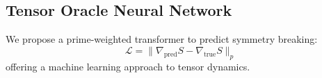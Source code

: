 \documentclass[12pt]{article}
\begin{document}
\subsection{Tensor Oracle Neural Network}
We propose a prime-weighted transformer to predict symmetry breaking:
\begin{equation}
\mathcal{L} = \| \nabla_{\text{pred}} S - \nabla_{\text{true}} S \|_p
\end{equation}
offering a machine learning approach to tensor dynamics.

\nocite{*}


\end{document}
